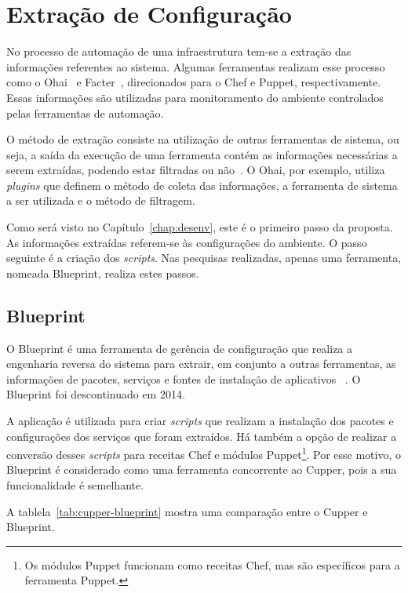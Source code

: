 \section{Extração de Configuração}

No processo de automação de uma infraestrutura tem-se a extração das
informações referentes ao sistema. Algumas ferramentas realizam esse
processo como o Ohai~\cite{ohaidoc:2016} e Facter~\cite{facterdoc:2016},
direcionados para o Chef e Puppet, respectivamente. Essas informações
são utilizadas para monitoramento do ambiente controlados pelas ferramentas
de automação.

O método de extração consiste na utilização de outras ferramentas de sistema,
ou seja, a saída da execução de uma ferramenta contém as informações necessárias
a serem extraídas, podendo estar filtradas ou não~\cite{ohaidoc:2016}. O Ohai,
por exemplo, utiliza \textit{plugins} que definem o método de coleta das informações,
a ferramenta de sistema a ser utilizada e o método de filtragem.

Como será visto no Capítulo~\ref{chap:desenv}, este é o primeiro passo da proposta.
As informações extraídas referem-se às configurações do ambiente. O passo
seguinte é a criação dos \textit{scripts}. Nas pesquisas realizadas, apenas uma ferramenta,
nomeada Blueprint, realiza estes passos.

\subsection{Blueprint}

O Blueprint é uma ferramenta de gerência de configuração que realiza a
engenharia reversa do sistema para extrair, em conjunto a outras ferramentas,
as informações de pacotes, serviços e fontes de instalação de aplicativos
~\cite{blueprint:2016}. O Blueprint foi descontinuado em 2014.

A aplicação é utilizada para criar \textit{scripts} que realizam
a instalação dos pacotes e configurações dos serviços que foram extraídos. Há
também a opção de realizar a conversão desses \textit{scripts} para receitas Chef e módulos
Puppet\footnote{Os módulos Puppet funcionam como receitas Chef, mas são específicos para a ferramenta Puppet.}.
Por esse motivo, o Blueprint é considerado como uma ferramenta concorrente ao Cupper,
pois a sua funcionalidade é semelhante.

A tablela~\ref{tab:cupper-blueprint} mostra uma comparação entre o Cupper e Blueprint.

